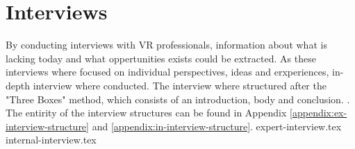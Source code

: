 \section{Interviews}
By conducting interviews with VR professionals, information about what is lacking today and what oppertunities exists could be extracted. As these interviews where focused on individual perspectives, ideas and erxperiences, in-depth interview where conducted.
\cite{interview:Boyce2006} The interview where structured after the "Three Boxes" method, which consists of an introduction, body and conclusion. \cite{interview:Hall2013}. The entirity of the interview structures can be found in Appendix \ref{appendix:ex-interview-structure} and \ref{appendix:in-interview-structure}.
{expert-interview.tex}
{internal-interview.tex}
